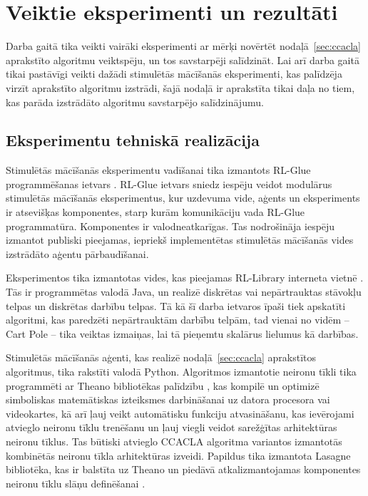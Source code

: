 \documentclass{ludis} %
\begin{document}
\section{Veiktie eksperimenti un rezultāti}\label{sec:exp}
Darba gaitā tika veikti vairāki eksperimenti ar mērķi novērtēt
nodaļā~\ref{sec:ccacla} aprakstīto algoritmu veiktspēju, un tos savstarpēji
salīdzināt. Lai arī darba gaitā tikai pastāvīgi veikti dažādi stimulētās
mācīšanās eksperimenti, kas palīdzēja virzīt aprakstīto algoritmu izstrādi, šajā
nodaļā ir aprakstīta tikai daļa no tiem, kas parāda izstrādāto algoritmu
savstarpējo salīdzinājumu.

\subsection{Eksperimentu tehniskā realizācija}
Stimulētās mācīšanās eksperimentu vadīšanai tika izmantots RL-Glue
programmēšanas ietvars \autocite{rl-glue}. RL-Glue ietvars sniedz iespēju veidot
modulārus stimulētās mācīšanās eksperimentus, kur uzdevuma vide, aģents un
eksperiments ir atsevišķas komponentes, starp kurām komunikāciju vada RL-Glue
programmatūra. Komponentes ir valodneatkarīgas. Tas nodrošināja iespēju izmantot
publiski pieejamas, iepriekš implementētas stimulētās mācīšanās vides izstrādāto
aģentu pārbaudīšanai. 

Eksperimentos tika izmantotas vides, kas pieejamas RL-Library interneta vietnē
\autocite{rl-library}. Tās ir programmētas valodā Java, un realizē diskrētas vai
nepārtrauktas stāvokļu telpas un diskrētas darbību telpas. Tā kā šī darba
ietvaros īpaši tiek apskatīti algoritmi, kas paredzēti nepārtrauktām darbību
telpām, tad vienai no vidēm -- Cart Pole -- tika veiktas izmaiņas, lai tā
pieņemtu skalārus lielumus kā darbības.

Stimulētās mācīšanās aģenti, kas realizē nodaļā~\ref{sec:ccacla} aprakstītos
algoritmus, tika rakstīti valodā Python. Algoritmos izmantotie neironu tīkli
tika programmēti ar Theano bibliotēkas palīdzību \autocite{Bastien-Theano-2012}
\autocite{bergstra+al:2010-scipy}, kas kompilē un optimizē simboliskas
matemātiskas izteiksmes darbināšanai uz datora procesora vai videokartes, kā arī
ļauj veikt automātisku funkciju atvasināšanu, kas ievērojami atvieglo neironu
tīklu trenēšanu un ļauj viegli veidot sarežģītas arhitektūras neironu tīklus.
Tas būtiski atvieglo CCACLA algoritma variantos izmantotās kombinētās neironu
tīkla arhitektūras izveidi. Papildus tika izmantota Lasagne bibliotēka, kas ir
balstīta uz Theano un piedāvā atkalizmantojamas komponentes neironu tīklu slāņu
definēšanai \autocite{lasagne}.
\end{document}
